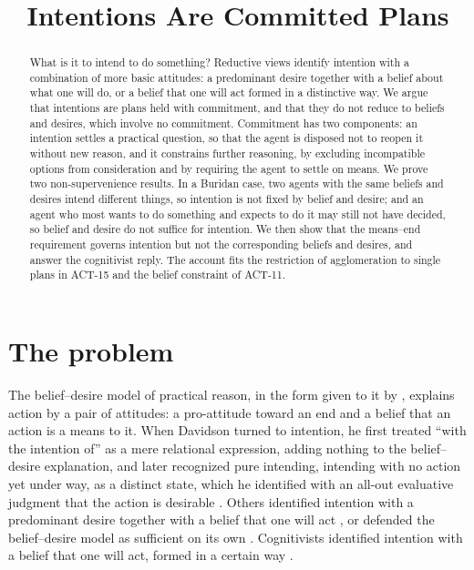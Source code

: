 \documentclass{situationist-preprint}
\title{Intentions Are Committed Plans}
\begin{document}
\maketitle

\begin{abstract}
What is it to intend to do something? Reductive views identify intention with a combination of more basic attitudes: a predominant desire together with a belief about what one will do, or a belief that one will act formed in a distinctive way. We argue that intentions are plans held with commitment, and that they do not reduce to beliefs and desires, which involve no commitment. Commitment has two components: an intention settles a practical question, so that the agent is disposed not to reopen it without new reason, and it constrains further reasoning, by excluding incompatible options from consideration and by requiring the agent to settle on means. We prove two non-supervenience results. In a Buridan case, two agents with the same beliefs and desires intend different things, so intention is not fixed by belief and desire; and an agent who most wants to do something and expects to do it may still not have decided, so belief and desire do not suffice for intention. We then show that the means--end requirement governs intention but not the corresponding beliefs and desires, and answer the cognitivist reply. The account fits the restriction of agglomeration to single plans in ACT-15 and the belief constraint of ACT-11.
\end{abstract}

\section{The problem}

The belief--desire model of practical reason, in the form given to it by \citet{Davidson1963}, explains action by a pair of attitudes: a pro-attitude toward an end and a belief that an action is a means to it. When Davidson turned to intention, he first treated \enquote{with the intention of} as a mere relational expression, adding nothing to the belief--desire explanation, and later recognized pure intending, intending with no action yet under way, as a distinct state, which he identified with an all-out evaluative judgment that the action is desirable \citep{Davidson1978}. Others identified intention with a predominant desire together with a belief that one will act \citep{Audi1973}, or defended the belief--desire model as sufficient on its own \citep{Sinhababu2013}. Cognitivists identified intention with a belief that one will act, formed in a certain way \citep{Harman1976,Velleman1989,Setiya2007}.
\end{document}
